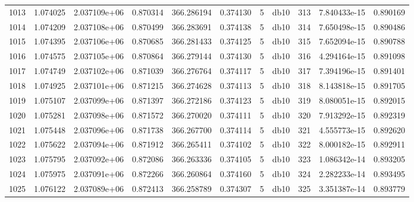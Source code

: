 \begin{tabular}{lrrrrrrlrrr}
1013 &    1.074025 &        2.037109e+06 &  0.870314 &              366.286194 &    0.374130 &       5 &         db10 &    313 &   7.840433e-15 &      0.890169 \\
1014 &    1.074209 &        2.037108e+06 &  0.870499 &              366.283691 &    0.374138 &       5 &         db10 &    314 &   7.650498e-15 &      0.890486 \\
1015 &    1.074395 &        2.037106e+06 &  0.870685 &              366.281433 &    0.374125 &       5 &         db10 &    315 &   7.652094e-15 &      0.890788 \\
1016 &    1.074575 &        2.037105e+06 &  0.870864 &              366.279144 &    0.374130 &       5 &         db10 &    316 &   4.294164e-15 &      0.891098 \\
1017 &    1.074749 &        2.037102e+06 &  0.871039 &              366.276764 &    0.374117 &       5 &         db10 &    317 &   7.394196e-15 &      0.891401 \\
1018 &    1.074925 &        2.037101e+06 &  0.871215 &              366.274628 &    0.374113 &       5 &         db10 &    318 &   8.143818e-15 &      0.891705 \\
1019 &    1.075107 &        2.037099e+06 &  0.871397 &              366.272186 &    0.374123 &       5 &         db10 &    319 &   8.080051e-15 &      0.892015 \\
1020 &    1.075281 &        2.037098e+06 &  0.871572 &              366.270020 &    0.374111 &       5 &         db10 &    320 &   7.913292e-15 &      0.892319 \\
1021 &    1.075448 &        2.037096e+06 &  0.871738 &              366.267700 &    0.374114 &       5 &         db10 &    321 &   4.555773e-15 &      0.892620 \\
1022 &    1.075622 &        2.037094e+06 &  0.871912 &              366.265411 &    0.374102 &       5 &         db10 &    322 &   8.000182e-15 &      0.892911 \\
1023 &    1.075795 &        2.037092e+06 &  0.872086 &              366.263336 &    0.374105 &       5 &         db10 &    323 &   1.086342e-14 &      0.893205 \\
1024 &    1.075975 &        2.037091e+06 &  0.872266 &              366.260864 &    0.374160 &       5 &         db10 &    324 &   2.282233e-14 &      0.893495 \\
1025 &    1.076122 &        2.037089e+06 &  0.872413 &              366.258789 &    0.374307 &       5 &         db10 &    325 &   3.351387e-14 &      0.893779 \\

\end{tabular}
